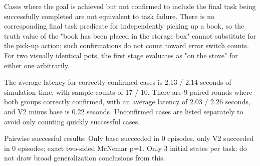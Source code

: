 Cases where the goal is achieved but not confirmed to include the final task being successfully completed are not equivalent to task failure. There is no corresponding final task predicate for independently picking up a book, so the truth value of the "book has been placed in the storage box" cannot substitute for the pick-up action; such confirmations do not count toward error switch counts. For two visually identical pots, the first stage evaluates as "on the stove" for either one arbitrarily.

The average latency for correctly confirmed cases is 2.13 / 2.14 seconds of simulation time, with sample counts of 17 / 10. There are 9 paired rounds where both groups correctly confirmed, with an average latency of 2.03 / 2.26 seconds, and V2 minus base is 0.22 seconds. Unconfirmed cases are listed separately to avoid only counting quickly successful cases.

Pairwise successful results: Only base succeeded in 0 episodes, only V2 succeeded in 0 episodes; exact two-sided McNemar p=1. Only 3 initial states per task; do not draw broad generalization conclusions from this.

